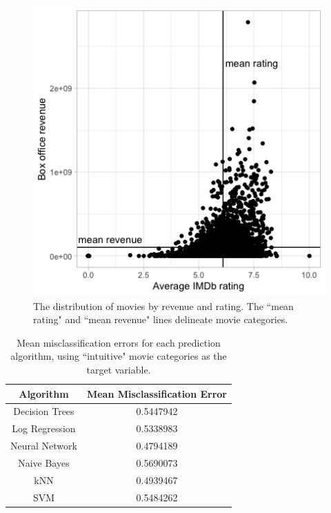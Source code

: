 \documentclass[12pt,english]{article}
\begin{document}
\begin{figure}[H]
    \centering
    \includegraphics{movie dist.png}
    \caption{The distribution of movies by revenue and rating. The ``mean rating" and ``mean revenue" lines delineate movie categories.}
    \label{fig:my_label}
\end{figure}

\begin{table}[t]
\centering
\begin{tabular}{c|c}
  Algorithm   &  Mean Misclassification Error \\
  \hline \hline
    Decision Trees & 0.5447942 \\
    \hline
    Log Regression & 0.5338983 \\
    \hline
    Neural Network & 0.4794189 \\
    \hline
    Naive Bayes & 0.5690073 \\
    \hline
    kNN & 0.4939467 \\
    \hline
    SVM & 0.5484262 \\ 
    \hline
\end{tabular}
\caption{Mean misclassification errors for each prediction algorithm, using ``intuitive" movie categories as the target variable.}
\label{table 1}
\end{table}
\end{document}
